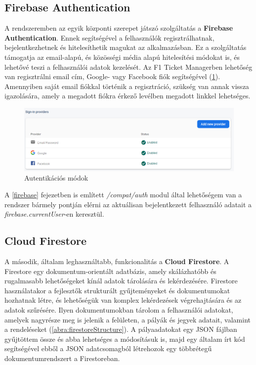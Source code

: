 \subsection {Firebase Authentication}

A rendszeremben az egyik központi szerepet játszó szolgáltatás a \textbf{Firebase Authentication}. Ennek segítségével a felhasználók regisztrálhatnak, bejelentkezhetnek és hitelesíthetik magukat az alkalmazásban. Ez a szolgáltatás támogatja az email-alapú, és közösségi média alapú hitelesítési módokat is, és lehetővé teszi a felhasználói adatok kezelését. Az F1 Ticket Managerben lehetőség van regisztrálni email cím, Google- vagy Facebook fiók segítségével (\ref{abra:loginMethods}). Amennyiben saját email fiókkal történik a regisztráció, szükség van annak vissza igazolására, amely a megadott fiókra érkező levélben megadott linkkel lehetséges.

\begin{figure}[!h]
	\centering
	\includegraphics[scale=0.4]{images/loginMethods}
	\caption{Autentikációs módok}
	\label{abra:loginMethods}
\end{figure}

A \ref{firebase} fejezetben is említett \textit{/compat/auth} modul által lehetőségem van a rendszer bármely pontján elérni az aktuálisan bejelentkezett felhasználó adatait a \textit{firebase.currentUser}-en keresztül.

\subsection {Cloud Firestore}

A második, általam leghasználtabb, funkcionalitás a \textbf{Cloud Firestore}. A Firestore egy dokumentum-orientált adatbázis, amely skálázhatóbb és rugalmasabb lehetőségeket kínál adatok tárolására és lekérdezésére. Firestore használatakor a fejlesztők strukturált gyűjteményeket és dokumentumokat hozhatnak létre, és lehetőségük van komplex lekérdezések végrehajtására és az adatok szűrésére. Ilyen dokumentumokban tárolom a felhasználói adatokat, amelyek nagyrésze meg is jelenik a felületen, a pályák és jegyek adatait, valamint a rendeléseket (\ref{abra:firestoreStructure}). A pályaadatokat egy JSON fájlban gyűjtöttem össze és abba lehetséges a módosításuk is, majd egy általam írt kód segítségével ebből a JSON adatcsomagból létrehozok egy többrétegű dokumentumrendszert a Firestoreban.

